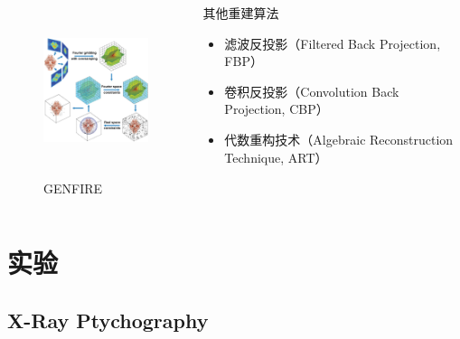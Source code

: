 \documentclass[12pt,aspectratio=169]{beamer} %
\begin{document}
\begin{frame}
    \begin{columns}
        \begin{column}{0.4\textwidth}
            \begin{figure}
                \includegraphics[height=5cm]{images/41598_2017_9847_Fig1_HTML.png}
                \caption{GENFIRE}
            \end{figure}
        \end{column}
        \begin{column}{0.6\textwidth}
            \begin{block}{其他重建算法}
                \begin{itemize}
                    \item 滤波反投影（Filtered Back Projection, FBP）
                    \item 卷积反投影（Convolution Back Projection, CBP）
                    \item 代数重构技术（Algebraic Reconstruction Technique, ART）
                \end{itemize}
            \end{block}
        \end{column}
    \end{columns}
\end{frame}

\section{实验}

\subsection{X-Ray Ptychography}
\end{document}
